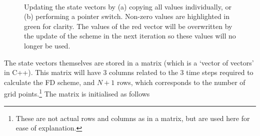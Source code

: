 \begin{figure}[t]
    \centering
    \\
    \caption{Updating the state vectors by (a) copying all values individually, or (b) performing a pointer switch. Non-zero values are highlighted in green for clarity. The values of the red vector will be overwritten by the update of the scheme in the next iteration so these values will no longer be used.\label{fig:pointerSwitchFull}}
\end{figure}

The state vectors themselves are stored in a matrix (which is a `vector of vectors' in C++). This matrix will have 3 columns related to the 3 time steps required to calculate the FD scheme, and $N+1$ rows, which corresponds to the number of grid points.\footnote{These are not actual rows and columns as in a matrix, but are used here for ease of explanation.} The matrix is initialised as follows

